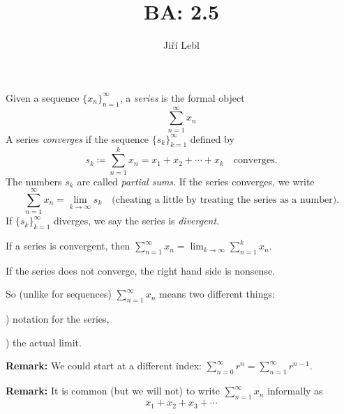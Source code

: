 \documentclass[10pt,aspectratio=169]{beamer}
\author{Ji\v{r}\'i Lebl}
\institute[OSU]{%
Departemento pri Matematiko de Oklahoma {\^S}tata Universitato}
\title{BA: 2.5}
\date{}
\begin{document}
\begin{frame}
\titlepage
\end{frame}

\begin{frame}
\begin{definition}
Given a sequence $\{ x_n \}_{n=1}^\infty$, a \emph{series} is the formal object
\begin{equation*}
\sum_{n=1}^\infty x_n
\end{equation*}
\pause
A series \emph{converges} if the sequence $\{ s_k \}_{k=1}^\infty$ defined by
\begin{equation*}
s_k \coloneqq \sum_{n=1}^k x_n = x_1 + x_2 + \cdots + x_k 
\quad \text{converges}.
\end{equation*}
\pause
The numbers $s_k$ are called
\emph{partial sums}.
\pause
If the series converges, we write
\begin{equation*}
\sum_{n=1}^\infty x_n =  \lim_{k\to\infty} s_k 
\quad \text{(cheating a little by treating the series as a number)}.
\end{equation*}
\pause
If $\{ s_k \}_{k=1}^\infty$ diverges,
we say the series is \emph{divergent}.
\end{definition}

\end{frame}

\begin{frame}
If a series is convergent, then
\quad
$\displaystyle
\sum_{n=1}^\infty x_n
=
\lim_{k\to\infty} 
\sum_{n=1}^k x_n$.

\pause
\medskip

If the series does not converge, the right hand side is nonsense.

\pause
So (unlike for sequences) $\displaystyle\sum_{n=1}^\infty x_n$ means two different things:

) notation for the series,

) the actual limit.

\pause
\medskip

\textbf{Remark:}
We could start at a different index:
\quad
$\displaystyle
\sum_{n=0}^\infty r^n = \sum_{n=1}^\infty r^{n-1}$.

\pause
\medskip

\textbf{Remark:}
It is common (but we will not) to write $\displaystyle\sum_{n=1}^\infty x_n$ informally as
\begin{equation*}
x_1 + x_2 + x_3 + \cdots
\end{equation*}

\end{frame}
\end{document}
